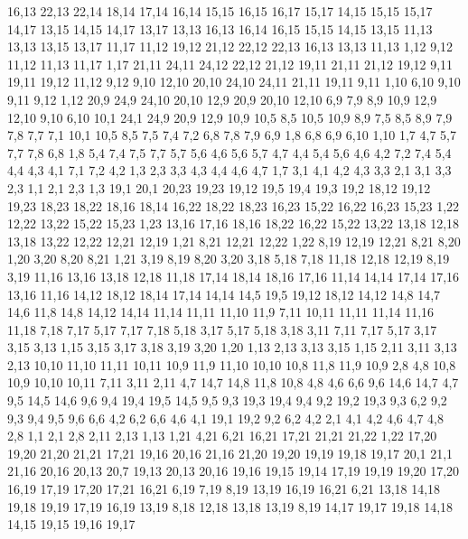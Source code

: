 %
16,13
22,13
22,14
18,14
17,14
16,14
%
15,15
16,15
16,17
15,17
%
14,15
15,15
15,17
14,17
%
13,15
14,15
14,17
13,17
%
13,13
16,13
16,14
16,15
15,15
14,15
13,15
%
11,13
13,13
13,15
13,17
11,17
%
11,12
19,12
21,12
22,12
22,13
16,13
13,13
11,13
%
1,12
9,12
11,12
11,13
11,17
1,17
%
21,11
24,11
24,12
22,12
21,12
%
19,11
21,11
21,12
19,12
%
9,11
19,11
19,12
11,12
9,12
%
9,10
12,10
20,10
24,10
24,11
21,11
19,11
9,11
%
1,10
6,10
9,10
9,11
9,12
1,12
%
20,9
24,9
24,10
20,10
%
12,9
20,9
20,10
12,10
%
6,9
7,9
8,9
10,9
12,9
12,10
9,10
6,10
%
10,1
24,1
24,9
20,9
12,9
10,9
10,5
%
8,5
10,5
10,9
8,9
%
7,5
8,5
8,9
7,9
7,8
7,7
%
7,1
10,1
10,5
8,5
7,5
7,4
7,2
%
6,8
7,8
7,9
6,9
%
1,8
6,8
6,9
6,10
1,10
%
1,7
4,7
5,7
7,7
7,8
6,8
1,8
%
5,4
7,4
7,5
7,7
5,7
5,6
%
4,6
5,6
5,7
4,7
%
4,4
5,4
5,6
4,6
%
4,2
7,2
7,4
5,4
4,4
4,3
%
4,1
7,1
7,2
4,2
%
1,3
2,3
3,3
4,3
4,4
4,6
4,7
1,7
%
3,1
4,1
4,2
4,3
3,3
%
2,1
3,1
3,3
2,3
%
1,1
2,1
2,3
1,3
19,1
20,1
20,23
19,23
19,12
19,5
19,4
19,3
19,2
%
18,12
19,12
19,23
18,23
18,22
18,16
18,14
%
16,22
18,22
18,23
16,23
%
15,22
16,22
16,23
15,23
%
1,22
12,22
13,22
15,22
15,23
1,23
%
13,16
17,16
18,16
18,22
16,22
15,22
13,22
13,18
%
12,18
13,18
13,22
12,22
12,21
12,19
%
1,21
8,21
12,21
12,22
1,22
%
8,19
12,19
12,21
8,21
8,20
%
1,20
3,20
8,20
8,21
1,21
%
3,19
8,19
8,20
3,20
%
3,18
5,18
7,18
11,18
12,18
12,19
8,19
3,19
%
11,16
13,16
13,18
12,18
11,18
%
17,14
18,14
18,16
17,16
%
11,14
14,14
17,14
17,16
13,16
11,16
%
14,12
18,12
18,14
17,14
14,14
%
14,5
19,5
19,12
18,12
14,12
14,8
14,7
14,6
%
11,8
14,8
14,12
14,14
11,14
11,11
11,10
11,9
%
7,11
10,11
11,11
11,14
11,16
11,18
7,18
7,17
%
5,17
7,17
7,18
5,18
%
3,17
5,17
5,18
3,18
%
3,11
7,11
7,17
5,17
3,17
3,15
3,13
%
1,15
3,15
3,17
3,18
3,19
3,20
1,20
%
1,13
2,13
3,13
3,15
1,15
%
2,11
3,11
3,13
2,13
%
10,10
11,10
11,11
10,11
%
10,9
11,9
11,10
10,10
%
10,8
11,8
11,9
10,9
%
2,8
4,8
10,8
10,9
10,10
10,11
7,11
3,11
2,11
%
4,7
14,7
14,8
11,8
10,8
4,8
%
4,6
6,6
9,6
14,6
14,7
4,7
%
9,5
14,5
14,6
9,6
%
9,4
19,4
19,5
14,5
9,5
%
9,3
19,3
19,4
9,4
%
9,2
19,2
19,3
9,3
%
6,2
9,2
9,3
9,4
9,5
9,6
6,6
%
4,2
6,2
6,6
4,6
%
4,1
19,1
19,2
9,2
6,2
4,2
%
2,1
4,1
4,2
4,6
4,7
4,8
2,8
%
1,1
2,1
2,8
2,11
2,13
1,13
1,21
4,21
6,21
16,21
17,21
21,21
21,22
1,22
%
17,20
19,20
21,20
21,21
17,21
%
19,16
20,16
21,16
21,20
19,20
19,19
19,18
19,17
%
20,1
21,1
21,16
20,16
20,13
20,7
%
19,13
20,13
20,16
19,16
19,15
19,14
%
17,19
19,19
19,20
17,20
%
16,19
17,19
17,20
17,21
16,21
%
6,19
7,19
8,19
13,19
16,19
16,21
6,21
%
13,18
14,18
19,18
19,19
17,19
16,19
13,19
%
8,18
12,18
13,18
13,19
8,19
%
14,17
19,17
19,18
14,18
%
14,15
19,15
19,16
19,17
